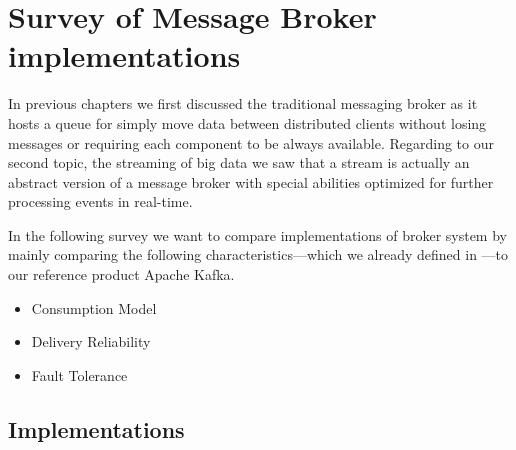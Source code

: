 \chapter{Survey of Message Broker implementations} 
\label{survey-broker}
In previous chapters we first discussed the traditional messaging broker as it
hosts a queue for simply move data between distributed clients without losing
messages or requiring each component to be always available. Regarding to our
second topic, the streaming of big data we saw that a stream is actually an
abstract version of a message broker with special abilities optimized for
further processing events in real-time. 

In the following survey we want to compare implementations of broker system by
mainly comparing the following characteristics---which we already defined in
---to our reference product Apache Kafka. 

\begin{itemize}
\item Consumption Model 
     \item Delivery Reliability 
         \item Fault Tolerance
\end{itemize}

\section{Implementations}

